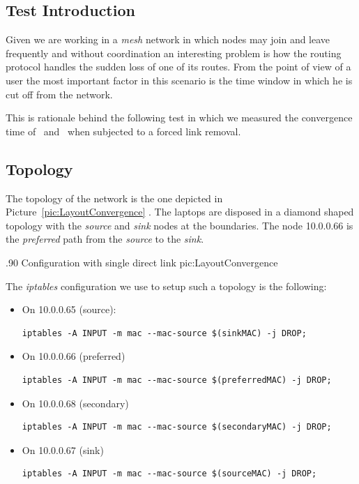 \subsection{Test Introduction}
Given we are working in a \emph{mesh} network in which nodes may join
and leave frequently and without coordination an interesting problem
is how the routing protocol handles the sudden loss of one of its
routes. From the point of view of a user the most important factor in
this scenario is the time window in which he is cut off from the
network.

This is rationale behind the following test in which we measured the
convergence time of \batman\ and \olsr\ when subjected to a forced
link removal.

\subsection{Topology}
 The topology of the network is the one depicted in
Picture~\ref{pic:LayoutConvergence} . The laptops are disposed in a
diamond shaped topology with the \emph{source} and \emph{sink} nodes
at the boundaries. The node 10.0.0.66 is the \emph{preferred} path
from the \emph{source} to the \emph{sink}.

        {.90\columnwidth}
        {Configuration with single direct link}
        {pic:LayoutConvergence}

The \emph{iptables} configuration we use to setup such a topology is
the following:

\begin{itemize}
\item On 10.0.0.65 (source):

\begin{verbatim}
iptables -A INPUT -m mac --mac-source $(sinkMAC) -j DROP;
\end{verbatim}

\item On 10.0.0.66 (preferred)
\begin{verbatim}
iptables -A INPUT -m mac --mac-source $(preferredMAC) -j DROP;
\end{verbatim}

\item On 10.0.0.68 (secondary)
\begin{verbatim}
iptables -A INPUT -m mac --mac-source $(secondaryMAC) -j DROP;
\end{verbatim}

\item On 10.0.0.67 (sink)
\begin{verbatim}
iptables -A INPUT -m mac --mac-source $(sourceMAC) -j DROP;
\end{verbatim}
\end{itemize}

